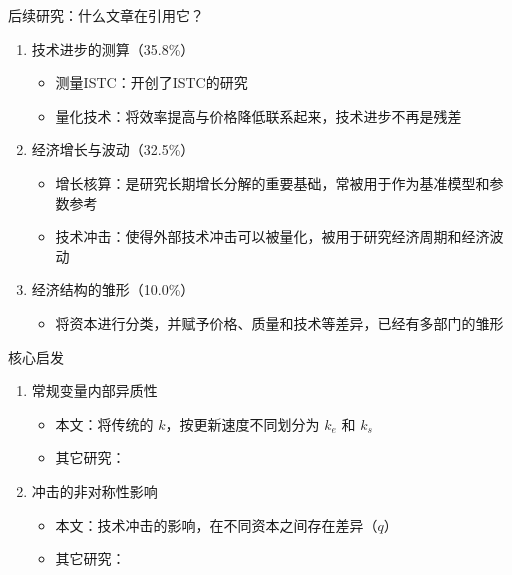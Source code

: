 \documentclass[aspectratio=169,10pt]{beamer}
\begin{document}
\begin{frame}{后续研究：什么文章在引用它？}

  \begin{block}{}
    \begin{enumerate}
      \item 技术进步的测算（35.8\%）
            \begin{itemize}
              \item 测量ISTC：开创了ISTC的研究
              \item 量化技术：将效率提高与价格降低联系起来，技术进步不再是残差
            \end{itemize}
      \item 经济增长与波动（32.5\%）
            \begin{itemize}
              \item 增长核算：是研究长期增长分解的重要基础，常被用于作为基准模型和参数参考
              \item 技术冲击：使得外部技术冲击可以被量化，被用于研究经济周期和经济波动
            \end{itemize}
      \item 经济结构的雏形（10.0\%）
            \begin{itemize}
              \item 将资本进行分类，并赋予价格、质量和技术等差异，已经有多部门的雏形
            \end{itemize}
    \end{enumerate}
  \end{block}


\end{frame}

\begin{frame}{核心启发}
  \begin{enumerate}
    \item 常规变量内部异质性
          \begin{itemize}
            \item 本文：将传统的 $k$，按更新速度不同划分为 $k_e$ 和 $k_s$
            \item 其它研究：
          \end{itemize}
    \item 冲击的非对称性影响
          \begin{itemize}
            \item 本文：技术冲击的影响，在不同资本之间存在差异（$q$）
            \item 其它研究：
          \end{itemize}
  \end{enumerate}
\end{frame}


%   
%   
\end{document}

